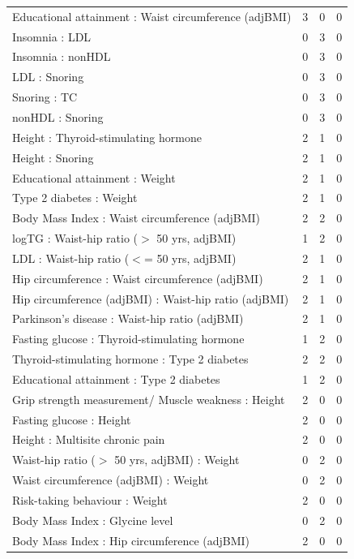 \begin{table}[ht]
\begin{tabular}{lrrr}
  Educational attainment : Waist circumference (adjBMI) &   3 &   0 &   0 \\ 
  Insomnia : LDL &   0 &   3 &   0 \\ 
  Insomnia : nonHDL &   0 &   3 &   0 \\ 
  LDL : Snoring &   0 &   3 &   0 \\ 
  Snoring : TC &   0 &   3 &   0 \\ 
  nonHDL : Snoring &   0 &   3 &   0 \\ 
  Height  : Thyroid-stimulating hormone  &   2 &   1 &   0 \\ 
  Height  : Snoring &   2 &   1 &   0 \\ 
  Educational attainment : Weight  &   2 &   1 &   0 \\ 
  Type 2 diabetes : Weight  &   2 &   1 &   0 \\ 
  Body Mass Index  : Waist circumference (adjBMI) &   2 &   2 &   0 \\ 
  logTG : Waist-hip ratio ($>$ 50 yrs, adjBMI) &   1 &   2 &   0 \\ 
  LDL : Waist-hip ratio ($<$= 50 yrs, adjBMI) &   2 &   1 &   0 \\ 
  Hip circumference  : Waist circumference (adjBMI) &   2 &   1 &   0 \\ 
  Hip circumference (adjBMI) : Waist-hip ratio (adjBMI) &   2 &   1 &   0 \\ 
  Parkinson's disease : Waist-hip ratio (adjBMI) &   2 &   1 &   0 \\ 
  Fasting glucose : Thyroid-stimulating hormone  &   1 &   2 &   0 \\ 
  Thyroid-stimulating hormone  : Type 2 diabetes &   2 &   2 &   0 \\ 
  Educational attainment : Type 2 diabetes &   1 &   2 &   0 \\ 
  Grip strength measurement/ Muscle weakness : Height  &   2 &   0 &   0 \\ 
  Fasting glucose : Height  &   2 &   0 &   0 \\ 
  Height  : Multisite chronic pain &   2 &   0 &   0 \\ 
  Waist-hip ratio ($>$ 50 yrs, adjBMI) : Weight  &   0 &   2 &   0 \\ 
  Waist circumference (adjBMI) : Weight  &   0 &   2 &   0 \\ 
  Risk-taking behaviour : Weight  &   2 &   0 &   0 \\ 
  Body Mass Index  : Glycine level  &   0 &   2 &   0 \\ 
  Body Mass Index  : Hip circumference (adjBMI) &   2 &   0 &   0 \\ 

\end{tabular}
\end{table}
